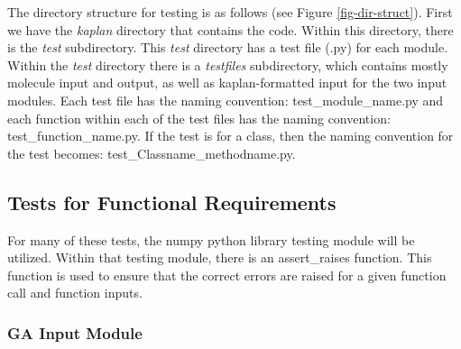 \documentclass[12pt, titlepage]{article}
\begin{document}
The directory structure for testing is as follows (see Figure 
\ref{fig-dir-struct}). First we have the \textit{kaplan} directory that 
contains the code. Within this directory, there is the \textit{test} 
subdirectory. This \textit{test} directory has a test file (.py) for each 
module. Within the \textit{test} directory there is a \textit{testfiles} 
subdirectory, which contains mostly molecule input and output, as well as 
kaplan-formatted input for the two input modules. Each test file has the naming 
convention: test\_module\_name.py and each function within each of the test 
files has the naming convention: test\_function\_name.py. If the test is for a 
class, then the naming convention for the test becomes: 
test\_Classname\_methodname.py.


\subsection{Tests for Functional Requirements}

For many of these tests, the numpy python library testing module will be 
utilized. Within that testing module, there is an assert\_raises function. This 
function is used to ensure that the correct errors are raised for a given 
function call and function inputs.


\subsubsection{GA Input Module} \label{test-ga_input}

\end{document}
